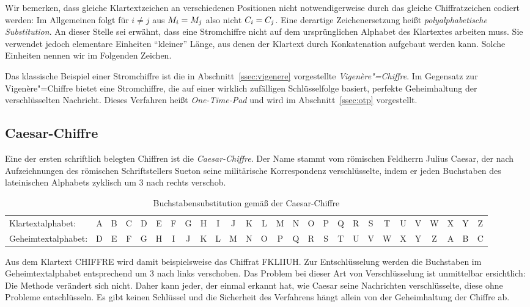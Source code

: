 Wir bemerken, dass gleiche Klartextzeichen an verschiedenen Positionen nicht notwendigerweise durch das gleiche Chiffratzeichen codiert werden: Im Allgemeinen folgt für $i \ne j$ aus $M_i = M_j$ also nicht $C_i = C_j$. Eine derartige Zeichenersetzung heißt \emph{polyalphabetische Substitution}. An dieser Stelle sei erwähnt, dass eine Stromchiffre nicht auf dem ursprünglichen Alphabet des Klartextes arbeiten muss. Sie verwendet jedoch elementare Einheiten "`kleiner"' Länge, aus denen der Klartext durch Konkatenation aufgebaut werden kann. Solche Einheiten nennen wir im Folgenden Zeichen.

Das klassische Beispiel einer Stromchiffre ist die in Abschnitt~\ref{ssec:vigenere} vorgestellte \emph{Vigenère"=Chiffre}. Im Gegensatz zur Vigenère"=Chiffre bietet eine Stromchiffre, die auf einer wirklich zufälligen Schlüsselfolge basiert, perfekte Geheimhaltung der verschlüsselten Nachricht. Dieses Verfahren heißt \emph{One-Time-Pad} \indexOTP und wird im Abschnitt~\ref{ssec:otp} vorgestellt.

\subsection{Caesar-Chiffre}
Eine der ersten schriftlich belegten Chiffren ist die \emph{Caesar-Chiffre}\indexCaesar. Der Name stammt vom römischen Feldherrn Julius Caesar, der nach Aufzeichnungen des römischen Schriftstellers Sueton seine militärische Korrespondenz verschlüsselte, indem er jeden Buchstaben des lateinischen Alphabets zyklisch um 3 nach rechts verschob.
\begin{table}[h]
	\centering
	\setlength{\tabcolsep}{2pt}
	\begin{tabular}{l*{26}{c}}
		Klartextalphabet: &A&B&C&D&E&F&G&H&I&J&K&L&M&N&O&P&Q&R&S&T&U&V&W&X&Y&Z\\
		Geheimtextalphabet: &D&E&F&G&H&I&J&K&L&M&N&O&P&Q&R&S&T&U&V&W&X&Y&Z&A&B&C\\
	\end{tabular}
	\caption{Buchstabensubstitution gemäß der Caesar-Chiffre}
\end{table}

Aus dem Klartext \glqq CHIFFRE\grqq{} wird damit beispielsweise das Chiffrat \glqq FKLIIUH\grqq. Zur Entschlüsselung werden die Buchstaben im Geheimtextalphabet entsprechend um 3 nach links verschoben. Das Problem bei dieser Art von Verschlüsselung ist unmittelbar ersichtlich: Die Methode verändert sich nicht. Daher kann jeder, der einmal erkannt hat, wie Caesar seine Nachrichten verschlüsselte, diese ohne Probleme entschlüsseln. Es gibt keinen Schlüssel und die Sicherheit des Verfahrens hängt allein von der Geheimhaltung der Chiffre ab.

